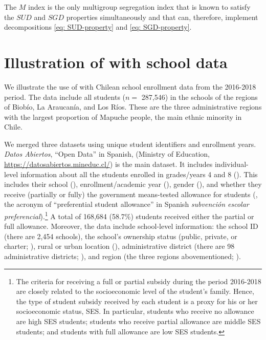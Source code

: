 The $M$ index is the only multigroup segregation index that is known to satisfy the $SUD$ and $SGD$ properties simultaneously and that can, therefore, implement decompositions \ref{eq: SUD-property} and \ref{eq: SGD-property}.



\section{Illustration of  with school data}
We illustrate the use of  with Chilean school enrollment data from the 2016-2018 period. The data include all students ($n =$ 287,546) in the schools of the regions of Biobío, La Araucanía, and Los Ríos. These are the three administrative regions with the largest proportion of Mapuche people, the main ethnic minority in Chile.

We merged three datasets using unique student identifiers and enrollment years. \textit{Datos Abiertos}, ``Open Data'' in Spanish, (Ministry of Education, \url{https://datosabiertos.mineduc.cl/}) is the main dataset. It includes individual-level information about all the students enrolled in grades/years 4 and 8 (). This includes their school (), enrollment/academic year (), gender (), and whether they receive (partially or fully) the government means-tested allowance for students (, the acronym of ``preferential student allowance'' in Spanish \textit{subvención escolar preferencial}).\footnote{The criteria for receiving a full or partial subsidy during the period 2016-2018 are closely related to the socioeconomic level of the student's family. Hence, the type of student subsidy received by each student is a proxy for his or her socioeconomic status, SES. In particular, students who receive no allowance are high SES students; students who receive partial allowance are middle SES students; and students with full allowance are low SES students.} A total of 168,684 (58.7\%) students received either the partial or full allowance.
Moreover, the data include school-level information: the school ID (there are 2,454 schools), the school's ownership status (public, private, or charter;  ), rural or urban location (), administrative district (there are 98 administrative districts; ), and region (the three regions abovementioned; ).

